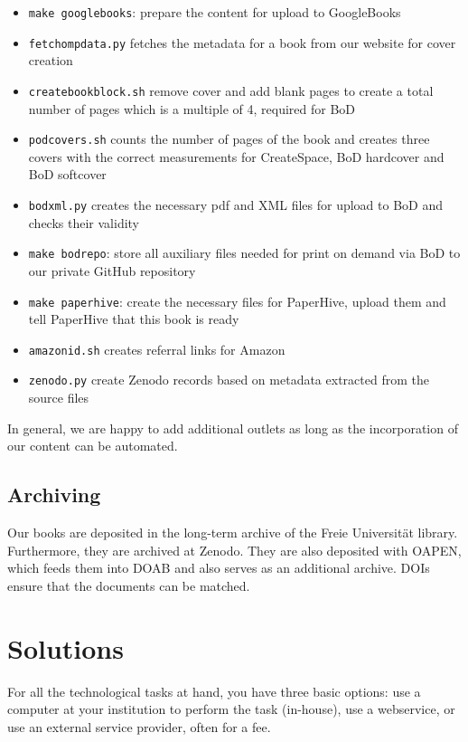 \documentclass[guidelines,nonflat,modfonts] {langsci/langscibook}
\begin{document}
\begin{itemize}
 \item \texttt{make googlebooks}: prepare the content for upload to GoogleBooks 
 \item \texttt{fetchompdata.py} fetches the metadata for a book from our website for cover creation 
 \item \texttt{createbookblock.sh} remove cover and add blank pages to create a total number of pages which is a multiple of 4, required for BoD
 \item \texttt{podcovers.sh} counts the number of pages of the book and creates three covers with the correct measurements for CreateSpace, BoD hardcover and BoD softcover 
 \item \texttt{bodxml.py} creates the necessary pdf and XML files for upload to BoD and checks their validity
 \item \texttt{make bodrepo}: store all auxiliary files needed for print on demand via BoD to our private GitHub repository
 \item \texttt{make paperhive}: create the necessary files for PaperHive, upload them and tell PaperHive that this book is ready 
 \item \texttt{amazonid.sh} creates referral links for Amazon
 \item \texttt{zenodo.py} create Zenodo records based on metadata extracted from the source files 
\end{itemize}
 
In general, we are happy to add additional outlets as long as the incorporation of our content can be automated.  
 
   


\subsection{Archiving}
Our books are deposited in the long-term archive of the Freie Universität library. Furthermore, they are archived at Zenodo. They are also deposited with OAPEN, which feeds them into DOAB and also serves as an additional archive. DOIs ensure that the documents can be matched.

\section{Solutions}
For all the technological tasks at hand, you have three basic options: use a computer at your institution to perform the task (in-house), use a webservice, or use an external service provider, often for a fee. 
\end{document}
